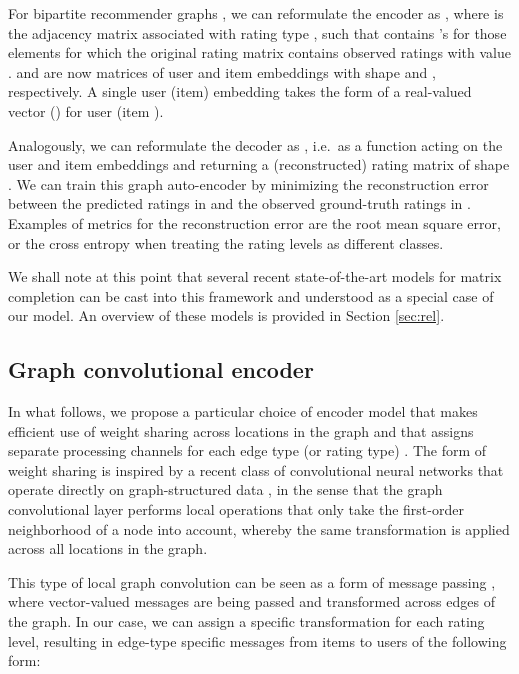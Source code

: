 \documentclass[twoside]{article}
\begin{document}
For bipartite recommender graphs , we can reformulate the encoder as , where  is the adjacency matrix associated with rating type , such that  contains 's for those elements for which the original rating matrix  contains observed ratings with value .  and  are now matrices of user and item embeddings with shape  and , respectively. A single user (item) embedding takes the form of a real-valued vector  () for user  (item ). 

Analogously, we can reformulate the decoder as , i.e.~as a function acting on the user and item embeddings and returning a (reconstructed) rating matrix  of shape . We can train this graph auto-encoder by minimizing the reconstruction error between the predicted ratings in  and the observed ground-truth ratings in . Examples of metrics for the reconstruction error are the root mean square error, or the cross entropy when treating the rating levels as different classes. 

We shall note at this point that several recent state-of-the-art models for matrix completion \cite{lee2013local, sedhain2015autorec, dziugaite2015neural, zheng2016neural} can be cast into this framework and understood as a special case of our model. An overview of these models is provided in Section \ref{sec:rel}.

\subsection{Graph convolutional encoder}
\label{sec:encoder}
In what follows, we propose a particular choice of encoder model that makes efficient use of weight sharing across locations in the graph and that assigns separate processing channels for each edge type (or rating type) . The form of weight sharing is inspired by a recent class of convolutional neural networks that operate directly on graph-structured data \cite{bruna2013spectral, duvenaud2015convolutional, defferrard2016convolutional, kipf2016semi}, in the sense that the graph convolutional layer performs local operations that only take the first-order neighborhood of a node into account, whereby the same transformation is applied across all locations in the graph.

This type of local graph convolution can be seen as a form of message passing \cite{dai2016discriminative, gilmer2017neural}, where vector-valued messages are being passed and transformed across edges of the graph. In our case, we can assign a specific transformation for each rating level, resulting in edge-type specific messages  from items  to users  of the following form:
\end{document}
